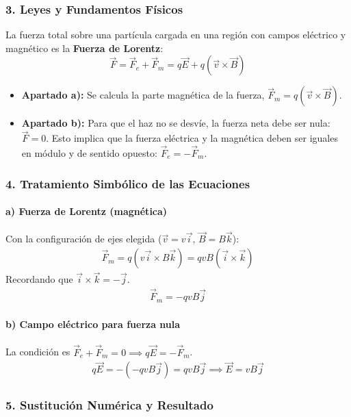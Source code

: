 \subsubsection*{3. Leyes y Fundamentos Físicos}
La fuerza total sobre una partícula cargada en una región con campos eléctrico y magnético es la \textbf{Fuerza de Lorentz}:
$$ \vec{F} = \vec{F}_e + \vec{F}_m = q\vec{E} + q(\vec{v} \times \vec{B}) $$
\begin{itemize}
    \item \textbf{Apartado a):} Se calcula la parte magnética de la fuerza, $\vec{F}_m = q(\vec{v} \times \vec{B})$.
    \item \textbf{Apartado b):} Para que el haz no se desvíe, la fuerza neta debe ser nula: $\vec{F} = 0$. Esto implica que la fuerza eléctrica y la magnética deben ser iguales en módulo y de sentido opuesto: $\vec{F}_e = -\vec{F}_m$.
\end{itemize}

\subsubsection*{4. Tratamiento Simbólico de las Ecuaciones}
\paragraph{a) Fuerza de Lorentz (magnética)}
Con la configuración de ejes elegida ($\vec{v} = v\vec{i}$, $\vec{B} = B\vec{k}$):
\begin{gather}
    \vec{F}_m = q(v\vec{i} \times B\vec{k}) = qvB (\vec{i} \times \vec{k})
\end{gather}
Recordando que $\vec{i} \times \vec{k} = -\vec{j}$.
\begin{gather}
    \vec{F}_m = -qvB\vec{j}
\end{gather}

\paragraph{b) Campo eléctrico para fuerza nula}
La condición es $\vec{F}_e + \vec{F}_m = 0 \implies q\vec{E} = -\vec{F}_m$.
\begin{gather}
    q\vec{E} = -(-qvB\vec{j}) = qvB\vec{j} \implies \vec{E} = vB\vec{j}
\end{gather}

\subsubsection*{5. Sustitución Numérica y Resultado}
